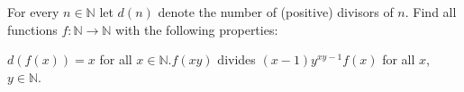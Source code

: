 For every $ n\in\mathbb{N}$ let $ d(n)$ denote the number of (positive) divisors of $ n$. Find all functions $ f: \mathbb{N}\to\mathbb{N}$ with the following properties:

$ d\left(f(x)\right) = x$ for all $ x\in\mathbb{N}$.$ f(xy)$ divides $ (x - 1)y^{xy - 1}f(x)$ for all $ x$,  $ y\in\mathbb{N}$.